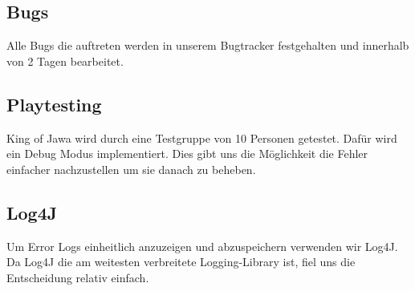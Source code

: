 \documentclass{scrartcl}
\begin{document}
\subsection{Bugs}
Alle Bugs die auftreten werden in unserem Bugtracker festgehalten und innerhalb von 2 Tagen bearbeitet.

\subsection{Playtesting}
King of Jawa wird durch eine Testgruppe von 10 Personen getestet. Dafür wird ein Debug Modus implementiert. Dies gibt uns die Möglichkeit die Fehler einfacher nachzustellen um sie danach zu beheben.

\subsection{Log4J}
Um Error Logs einheitlich anzuzeigen und abzuspeichern verwenden wir Log4J. Da Log4J die am weitesten verbreitete Logging-Library ist, fiel uns die Entscheidung relativ einfach. 
\end{document}
